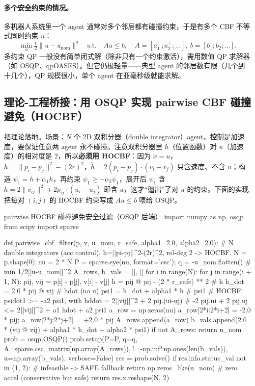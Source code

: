 \paragraph{多个安全约束的情况。}
多机器人系统里一个 agent 通常对多个邻居都有碰撞约束，于是有多个 CBF 不等式同时约束 $u$：
\begin{equation}
  \min_u\tfrac12\|u-u_{\text{nom}}\|^2\quad\text{s.t.}\quad Au\le b,\quad A=[a_1^\top;a_2^\top;\dots],\ b=[b_1;b_2;\dots].
  \label{eq:mh-cbf-multi}
\end{equation}
多约束 QP 一般没有简单闭式解（除非只有一个约束激活），需用数值 QP 求解器（如 OSQP、qpOASES）。但它仍极轻量——典型 agent 的邻居数有限（几个到十几个），QP 规模很小，单个 agent 在亚毫秒级就能求解。

\subsection{理论-工程桥接：用 OSQP 实现 pairwise CBF 碰撞避免（HOCBF）}
\label{sec:mh-cbf-code}

把理论落地。场景：$N$ 个 2D 双积分器（double integrator）agent，控制是加速度，要保证任意两 agent 永不碰撞。注意双积分器里 $h$（位置函数）对 $u$（加速度）的相对度是 $2$，所以\textbf{必须用 HOCBF}：因为 $\ddot x=u$，$h=\|p_i-p_j\|^2-(2r)^2$，$\dot h=2(p_i-p_j)\cdot(v_i-v_j)$ 只含速度、不含 $u$；构造 $\psi_1=\dot h+\alpha_1h$，再约束 $\dot\psi_1\ge-\alpha_2\psi_1$，展开后 $\dot\psi_1$ 含 $\ddot h=2\|v_{ij}\|^2+2p_{ij}\cdot(u_i-u_j)$ 即含 $u$，这才“逼出”了对 $u$ 的约束。下面的实现把每对 $(i,j)$ 的 HOCBF 约束写成 $Au\le b$ 喂给 OSQP。

\begin{codebox}[Python]{pairwise HOCBF 碰撞避免安全过滤（OSQP 后端）}
import numpy as np, osqp
from scipy import sparse

def pairwise_cbf_filter(p, v, u_nom, r_safe, alpha1=2.0, alpha2=2.0):
    # N double integrators (acc control). h=||pi-pj||^2-(2r)^2, rel-deg 2 -> HOCBF.
    N = p.shape[0]; nu = 2 * N
    P = sparse.eye(nu, format='csc'); q = -u_nom.flatten()   # min 1/2||u-u_nom||^2
    A_rows, b_vals = [], []
    for i in range(N):
        for j in range(i + 1, N):
            pij, vij = p[i] - p[j], v[i] - v[j]
            h = pij @ pij - (2 * r_safe) ** 2          # h
            h_dot = 2.0 * pij @ vij                     # hdot (no u)
            psi1 = h_dot + alpha1 * h                   # psi1
            # HOCBF: psidot1 >= -a2 psi1, with hddot = 2||vij||^2 + 2 pij.(ui-uj)
            #   -2 pij.ui + 2 pij.uj <= 2||vij||^2 + a1 hdot + a2 psi1
            a_row = np.zeros(nu)
            a_row[2*i:2*i+2] = -2.0 * pij; a_row[2*j:2*j+2] = +2.0 * pij
            A_rows.append(a_row)
            b_vals.append(2.0 * (vij @ vij) + alpha1 * h_dot + alpha2 * psi1)
    if not A_rows:
        return u_nom
    prob = osqp.OSQP()
    prob.setup(P=P, q=q, A=sparse.csc_matrix(np.array(A_rows)),
               l=-np.inf*np.ones(len(b_vals)), u=np.array(b_vals), verbose=False)
    res = prob.solve()
    if res.info.status_val not in (1, 2):     # infeasible -> SAFE fallback
        return np.zeros_like(u_nom)           # zero accel (conservative but safe)
    return res.x.reshape(N, 2)
\end{codebox}

